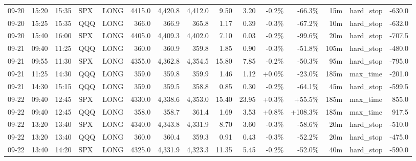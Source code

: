 \documentclass[11pt,a4paper,twoside]{article}
\begin{document}
\begin{landscape}
\begin{center}
\begin{longtable}{>{\color{txtmain}}l l l l l r r r r r r r r >{\color{txtmain}}l r}
09-20 & 15:20 & 15:35 & SPX & LONG & 4415.0 & 4,420.8 & 4,412.0 & 9.50 & 3.20 & \textcolor{lossred}{-0.2\%} & \textcolor{lossred}{-66.3\%} & 15m & hard\_stop & \textcolor{lossred}{-630.0} \\
09-20 & 15:25 & 15:35 & QQQ & LONG & 366.0 & 366.9 & 365.8 & 1.17 & 0.39 & \textcolor{lossred}{-0.3\%} & \textcolor{lossred}{-67.2\%} & 10m & hard\_stop & \textcolor{lossred}{-632.0} \\
09-20 & 15:40 & 16:00 & SPX & LONG & 4405.0 & 4,409.3 & 4,402.0 & 7.10 & 0.03 & \textcolor{lossred}{-0.2\%} & \textcolor{lossred}{-99.6\%} & 20m & hard\_stop & \textcolor{lossred}{-707.5} \\
09-21 & 09:40 & 11:25 & QQQ & LONG & 360.0 & 360.9 & 359.8 & 1.85 & 0.90 & \textcolor{lossred}{-0.3\%} & \textcolor{lossred}{-51.8\%} & 105m & hard\_stop & \textcolor{lossred}{-480.0} \\
09-21 & 09:55 & 11:30 & SPX & LONG & 4355.0 & 4,362.8 & 4,354.5 & 15.80 & 7.85 & \textcolor{lossred}{-0.2\%} & \textcolor{lossred}{-50.3\%} & 95m & hard\_stop & \textcolor{lossred}{-795.0} \\
09-21 & 11:25 & 14:30 & QQQ & LONG & 359.0 & 359.8 & 359.9 & 1.46 & 1.12 & \textcolor{wingreen}{+0.0\%} & \textcolor{lossred}{-23.0\%} & 185m & max\_time & \textcolor{lossred}{-201.0} \\
09-21 & 14:30 & 15:15 & QQQ & LONG & 359.0 & 359.5 & 358.8 & 0.85 & 0.30 & \textcolor{lossred}{-0.2\%} & \textcolor{lossred}{-64.1\%} & 45m & hard\_stop & \textcolor{lossred}{-599.5} \\
09-22 & 09:40 & 12:45 & SPX & LONG & 4330.0 & 4,338.6 & 4,353.0 & 15.40 & 23.95 & \textcolor{wingreen}{+0.3\%} & \textcolor{wingreen}{+55.5\%} & 185m & max\_time & \textcolor{wingreen}{855.0} \\
09-22 & 09:40 & 12:45 & QQQ & LONG & 358.0 & 358.7 & 361.4 & 1.69 & 3.53 & \textcolor{wingreen}{+0.8\%} & \textcolor{wingreen}{+108.3\%} & 185m & max\_time & \textcolor{wingreen}{917.5} \\
09-22 & 13:20 & 13:40 & SPX & LONG & 4340.0 & 4,343.8 & 4,331.9 & 8.70 & 3.60 & \textcolor{lossred}{-0.3\%} & \textcolor{lossred}{-58.6\%} & 20m & hard\_stop & \textcolor{lossred}{-510.0} \\
09-22 & 13:20 & 13:40 & QQQ & LONG & 360.0 & 360.4 & 359.3 & 0.91 & 0.43 & \textcolor{lossred}{-0.3\%} & \textcolor{lossred}{-52.2\%} & 20m & hard\_stop & \textcolor{lossred}{-475.0} \\
09-22 & 13:40 & 14:20 & SPX & LONG & 4325.0 & 4,331.9 & 4,323.3 & 11.35 & 5.45 & \textcolor{lossred}{-0.2\%} & \textcolor{lossred}{-52.0\%} & 40m & hard\_stop & \textcolor{lossred}{-590.0} \\

\end{longtable}
\end{center}
\end{landscape}
\end{document}
